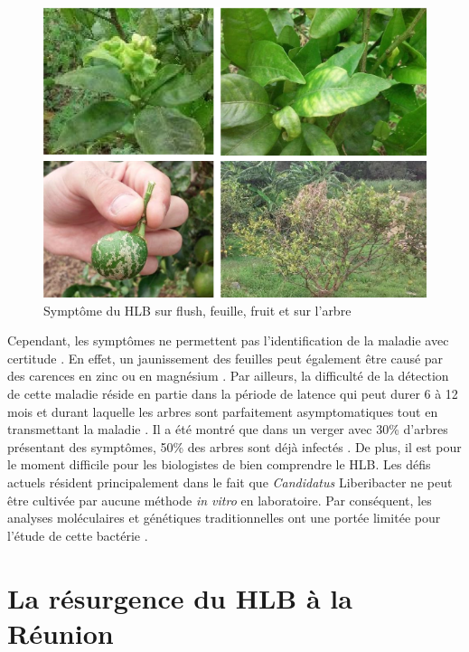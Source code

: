 \documentclass[
  11pt,
  french,
  a4paper,
  extrafontsizes,onecolumn,openright
  ]{memoir}
\begin{document}
\begin{figure}

{\centering \includegraphics[width=0.8\linewidth]{Images/Figure1} 

}

\caption{Symptôme du HLB sur flush, feuille, fruit et sur l'arbre}\label{fig:1}
\end{figure}

\normalsize

\vfill
\newpage

Cependant, les symptômes ne permettent pas l'identification de la maladie avec certitude \autocite{gottwald_preliminary_1989}. En effet, un jaunissement des feuilles peut également être causé par des carences en zinc ou en magnésium \autocite{aubert_greening_1989}. Par ailleurs, la difficulté de la détection de cette maladie réside en partie dans la période de latence qui peut durer 6 à 12 mois et durant laquelle les arbres sont parfaitement asymptomatiques tout en transmettant la maladie \autocite{bove_huanglongbing_2006}. Il a été montré que dans un verger avec 30\% d'arbres présentant des symptômes, 50\% des arbres sont déjà infectés \autocite{bove_huanglongbing_2006}. De plus, il est pour le moment difficile pour les biologistes de bien comprendre le HLB. Les défis actuels résident principalement dans le fait que \emph{Candidatus} Liberibacter ne peut être cultivée par aucune méthode \emph{in vitro} en laboratoire. Par conséquent, les analyses moléculaires et génétiques traditionnelles ont une portée limitée pour l'étude de cette bactérie \autocite{wang_citrus_2019}.

\vfill
\newpage

\hypertarget{la-ruxe9surgence-du-hlb-uxe0-la-ruxe9union}{%
\section{La résurgence du HLB à la Réunion}\label{la-ruxe9surgence-du-hlb-uxe0-la-ruxe9union}}
\end{document}
